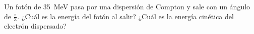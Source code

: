 \documentclass[./../main.tex]{subfiles}
\begin{document}
    \begin{exercise}
        Un fotón de \qty{35}{\MeV} pasa por una dispersión de Compton y sale con un ángulo de \(\tfrac{\pi}{3}\). ¿Cuál es la energía del fotón al salir? ¿Cuál es la energía cinética del electrón dispersado?
    \end{exercise}
\end{document}
